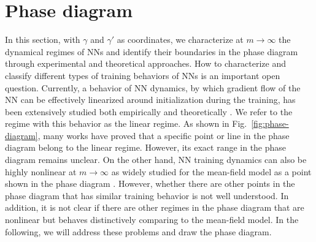 \documentclass[twoside,11pt]{article}
\begin{document}
\section{Phase diagram}
In this section, with $\gamma$ and $\gamma'$ as coordinates, we characterize at $m\to\infty$ the dynamical regimes of NNs and identify their boundaries in the phase diagram through experimental and theoretical approaches.
How to characterize and classify different types of training behaviors of NNs is an important open question.  Currently, a behavior of NN dynamics, by which gradient flow of the NN can be effectively linearized around initialization during the training, has been extensively studied both empirically and theoretically \cite{jacot_neural_2018,lee_wide_2019,arora2019exact,e2020comparative}. We refer to the regime with this behavior as the linear regime. As shown in Fig.~\ref{fig:phase-diagram}, many works have proved that a specific point or line in the phase diagram belong to the linear regime. However, its exact range in the phase diagram remains unclear. On the other hand, NN training dynamics can also be highly nonlinear at $m\to\infty$ as widely studied for the mean-field model as a point shown in the phase diagram \cite{mei_mean_2018,sirignano_mean_2020,rotskoff_parameters_2018}. However, whether there are other points in the phase diagram that has similar training behavior is not well understood. In addition, it is not clear if there are other regimes in the phase diagram that are nonlinear but behaves distinctively comparing to the mean-field model. In the following, we will address these problems and draw the phase diagram.
\end{document}
